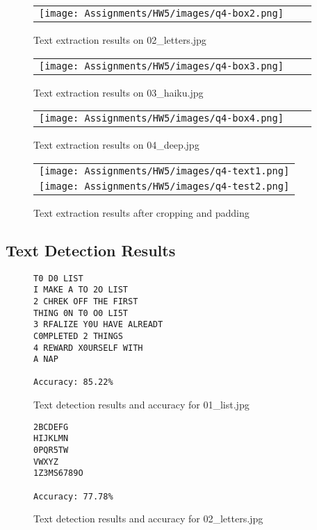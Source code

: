 \documentclass[a4paper]{article}
\begin{document}
\begin{figure}[!ht]
\centering
\begin{tabular}{ccc}
{\texttt{[image: Assignments/HW5/images/q4-box2.png]}}
\end{tabular}
\caption{Text extraction results on 02\_letters.jpg}
\end{figure}

\begin{figure}[!ht]
\centering
\begin{tabular}{ccc}
{\texttt{[image: Assignments/HW5/images/q4-box3.png]}}
\end{tabular}
\caption{Text extraction results on 03\_haiku.jpg}
\end{figure}

\begin{figure}[!ht]
\centering
\begin{tabular}{ccc}
{\texttt{[image: Assignments/HW5/images/q4-box4.png]}}
\end{tabular}
\caption{Text extraction results on 04\_deep.jpg}
\end{figure}

\begin{figure}[!ht]
\centering
\begin{tabular}{c}
{\texttt{[image: Assignments/HW5/images/q4-text1.png]}} \\
{\texttt{[image: Assignments/HW5/images/q4-test2.png]}}
\end{tabular}
\caption{Text extraction results after cropping and padding}
\end{figure}

\subsection{Text Detection Results}
\begin{figure}[!ht]
\centering
\begin{BVerbatim}
T0 D0 LIST
I MAKE A TO 2O LIST
2 CHREK OFF THE FIRST
THING 0N T0 O0 LI5T
3 RFALIZE Y0U HAVE ALREADT
C0MPLETED 2 THINGS
4 REWARD X0URSELF WITH
A NAP

Accuracy: 85.22%
\end{BVerbatim}
\caption{Text detection results and accuracy for 01\_list.jpg}
\end{figure}

\begin{figure}[!ht]
\centering
\begin{BVerbatim}
2BCDEFG
HIJKLMN
0PQR5TW
VWXYZ
1Z3MS6789O

Accuracy: 77.78%
\end{BVerbatim}
\caption{Text detection results and accuracy for 02\_letters.jpg}
\end{figure}
\end{document}
